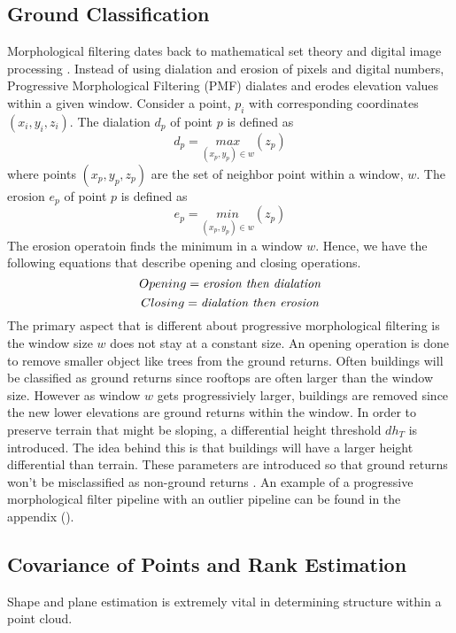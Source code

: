 \documentclass[11pt]{article}
\theoremstyle{definition}
\begin{document}
\subsection{Ground Classification}\label{sub:ground}
Morphological filtering dates back to mathematical set theory and digital image processing \cite{zhang2003progressive}.  Instead of using dialation and erosion of pixels and digital numbers, Progressive Morphological Filtering (PMF) dialates and erodes elevation values within a given window.  Consider a point, $p_i$ with corresponding coordinates $(x_i,y_i,z_i)$.  The dialation $d_{p}$ of point $p$ is defined as 
\begin{equation}\label{eqn:dialation}
d_{p}=\underset{(x_{p},y_{p})\in w}{max} (z_{p})
\end{equation}
where points $(x_{p},y_{p},z_{p})$ are the set of neighbor point within a window, $w$.  The erosion $e_p$ of point $p$ is defined as 
\begin{equation}\label{eqn:erosion}
e_{p}=\underset{(x_{p},y_{p})\in w}{min} (z_{p})
\end{equation}
The erosion operatoin finds the minimum in a window $w$.  Hence, we have the following equations that describe opening and closing operations.  
\begin{equation}\label{eqn:opening}
Opening=\text{\textit{erosion then dialation}}
\end{equation}
\begin{equation}\label{eqn:closing}
Closing=\text{\textit{dialation then erosion}}
\end{equation}
The primary aspect that is different about progressive morphological filtering is the window size $w$ does not stay at a constant size.  An opening operation is done to remove smaller object like trees from the ground returns.  Often buildings will be classified as ground returns since rooftops are often larger than the window size.  However as window $w$ gets progressiviely larger, buildings are removed since the new lower elevations are ground returns within the window.  In order to preserve terrain that might be sloping, a differential height threshold $dh_T$ is introduced.  The idea behind this is that buildings will have a larger height differential than terrain.  These parameters are introduced so that ground returns won't be misclassified as non-ground returns \cite{zhang2003progressive}.  An example of a progressive morphological filter pipeline with an outlier pipeline can be found in the appendix ().
\subsection{Covariance of Points and Rank Estimation}\label{sub:Cov_Rank}
Shape and plane estimation is extremely vital in determining structure within a point cloud.   
	\newpage


	
	
\end{document}
